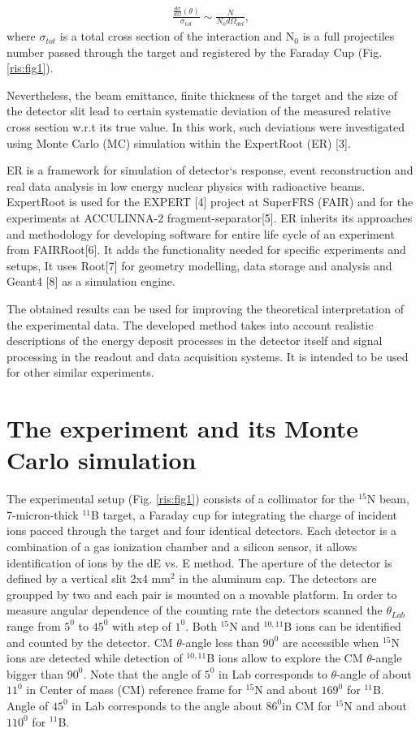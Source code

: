 \documentclass[%
 aip,
cp,  %
 amsmath,amssymb,%
 reprint,%
]{revtex4-2}
\begin{document}
\begin{eqnarray}
 \frac{ \frac{d\sigma}{d\Omega}(\theta) }{\sigma_{tot}} \sim \frac{N}{N_0 d\Omega_{det}},
\end{eqnarray}
where
$\sigma$$_{tot}$ is a total cross section of the interaction
and N$_{0}$ is a full projectiles number passed through the target and registered by the Faraday Cup (Fig. \ref{ris:fig1}).

Nevertheless, the beam emittance, finite thickness of the target and the size of the detector slit lead to certain systematic deviation of the measured relative cross section w.r.t its true value. In this work, such deviations were investigated using Monte Carlo (MC) simulation within the ExpertRoot (ER) [3].

ER is a framework for simulation of detector`s response, event reconstruction and real data analysis in low energy nuclear physics with radioactive beams. ExpertRoot is used for the EXPERT [4] project at SuperFRS (FAIR) and for the experiments at ACCULINNA-2 fragment-separator[5].  ER inherits its approaches and methodology for developing software for entire life cycle of an experiment from FAIRRoot[6]. It adds the functionality needed for specific experiments and setups, It uses Root[7] for geometry modelling, data storage and analysis and Geant4 [8] as a simulation engine.

The obtained results can be used for improving the theoretical interpretation of the experimental data. The developed method takes into account realistic descriptions of the energy deposit processes in the detector itself and signal processing in the readout and data acquisition systems. It is intended to be used for other similar experiments.

\section{The experiment and its Monte Carlo simulation}

The experimental setup (Fig. \ref{ris:fig1}) consists of a collimator for the ${}^{15}$N beam, 7-micron-thick ${}^{11}$B target, a Faraday cup for integrating the charge of incident ions pacced through the target and four identical detectors. Each detector is a combination of a gas ionization chamber and a silicon sensor, it allows identification of ions by the dE vs. E method. The aperture of the detector is defined by a vertical slit 2x4 mm$^2$ in the aluminum cap. The detectors are groupped by two and each pair is mounted on a movable platform. In order to measure angular dependence of the counting rate the detectors scanned the $\theta_{Lab}$ range  from $5 ^0$ to $45 ^0$ with step of $1^0$. Both ${}^{15}$N and ${}^{10,11}$B ions can be identified and counted by the detector. CM $\theta$-angle less than 9$0^0$  are accessible when ${}^{15}$N ions are detected while detection of ${}^{10,11}$B ions allow to explore the CM $\theta$-angle bigger than 9$0^0$. Note that the angle of $5 ^0$ in Lab corresponds to $\theta$-angle of about $11 ^0$ in Center of mass (CM) reference frame for $^{15}$N and about $169 ^0$ for $^{11}$B. Angle of $45 ^0$ in Lab corresponds to the angle about $86 ^{0}$in CM for $^{15}$N and about $110 ^0$ for ${}^{11}$B. 
\end{document}
